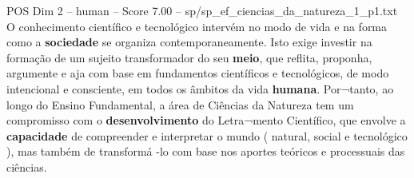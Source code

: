 \begin{textsample}{POS Dim 2 – human – Score 7.00 – sp/sp\_ef\_ciencias\_da\_natureza\_1\_p1.txt}  \label{ex:f2_pos_007}
O conhecimento científico e tecnológico intervém no modo de vida e na forma como a \textbf{sociedade} se organiza contemporaneamente.
Isto exige investir na formação de um sujeito transformador do seu \textbf{meio}, que reflita, proponha, argumente e aja com base em fundamentos científicos e tecnológicos, de modo intencional e consciente, em todos os âmbitos da vida \textbf{humana}.
Por¬tanto, ao longo do Ensino Fundamental, a área de Ciências da Natureza tem um compromisso com o \textbf{desenvolvimento} do Letra¬mento Científico, que envolve a \textbf{capacidade} de compreender e interpretar o mundo ( natural, social e tecnológico ), mas também de transformá -lo com base nos aportes teóricos e processuais das ciências.

\end{textsample}
